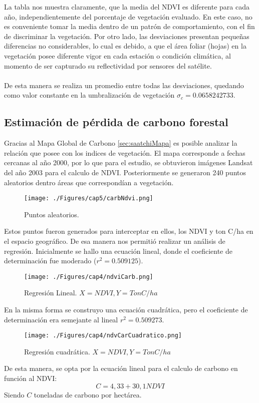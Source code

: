 La tabla nos muestra claramente, que la media del NDVI es diferente para cada a\~{n}o, independientemente del porcentaje de vegetaci\'on evaluado. En este caso, no es conveniente tomar la media dentro de un patrón de comportamiento, con el fin de discriminar la vegetaci\'on. Por otro lado, las desviaciones presentan peque\~{n}as diferencias no considerables, lo cual es debido, a que el \'area foliar (hojas) en la vegetaci\'on posee diferente vigor en cada estaci\'on o condici\'on clim\'atica, al momento de ser capturado su reflectividad por sensores del sat\'elite.\\~\\
De esta manera se realiza un promedio entre todas las desviaciones, quedando como valor constante en la umbralizaci\'on de vegetaci\'on $ \sigma_{c} = 0.0658242733 $.
\subsection{Estimaci\'on de p\'erdida de carbono forestal}\label{subsec:estimacionCarbono}
Gracias al Mapa Global de Carbono \ref{sec:saatchiMapa} es posible analizar la relaci\'on que posee con los indices de vegetaci\'on. El mapa corresponde a fechas cercanas al a\~{n}o 2000, por lo que para el estudio, se obtuvieron im\'agenes Landsat del a\~{n}o 2003 para el calculo de NDVI. Posteriormente se generaron 240 puntos aleatorios dentro \'areas que correspond\'ian a vegetaci\'on.
\begin{figure}[H]
	\centering
	\texttt{[image: ./Figures/cap5/carbNdvi.png]}
	\caption{Puntos aleatorios.}
	\label{fig:aleatorioCrb}
\end{figure}
Estos puntos fueron generados para interceptar en ellos, los NDVI y ton C/ha en el espacio geográfico. De esa manera nos permiti\'o realizar un an\'alisis de regresi\'on. Inicialmente se hallo una ecuaci\'on lineal, donde el coeficiente de determinaci\'on fue moderado ($ r^{2}=0.509125 $).
\begin{figure}[H]
	\centering
	\texttt{[image: ./Figures/cap4/ndviCarb.png]}
	\caption{Regresi\'on Lineal. $ X=NDVI, Y=TonC/ha $}
	\label{fig:linealCar}
\end{figure}
En la misma forma se construyo una ecuaci\'on cuadr\'atica, pero el coeficiente de determinaci\'on era semejante al lineal $ r^{2}=0.509273 $.
\begin{figure}[H]
	\centering
	\texttt{[image: ./Figures/cap4/ndvCarCuadratico.png]}
	\caption{Regresi\'on cuadr\'atica. $ X=NDVI, Y=TonC/ha $}
	\label{fig:cuaCar}
\end{figure}
De esta manera, se opta por la ecuaci\'on lineal para el calculo de carbono en funci\'on al NDVI:
		\begin{equation}
		C=4,33+30,1 NDVI
		\end{equation} 
Siendo $ C $ toneladas de carbono por hect\'area.

